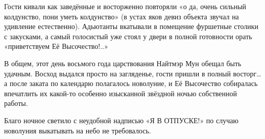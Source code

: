 \documentclass[twoside,a5paper,12pt]{extbook}
\begin{document}
Гости кивали как заведённые и восторженно повторяли «о да, очень сильный колдунство, пони уметь колдунство» (в устах яков девиз объекта звучал на удивление естественно). Адьютанты вкатывали в помещение фуршетные столики с закусками, а самый голосистый уже стоял у двери в полной готовности орать «приветствуем Её Высочество!..»

В общем, этот день восьмого года царствования Найтмэр Мун обещал быть удачным. Восход выдался просто на загляденье, гости пришли в полный восторг… а после заката по календарю полагалось новолуние, и Её Высочество собиралась впечатлить их какой-то особенно изысканной звёздной ночью собственной работы.

Благо ночное светило с неудобной надписью «{\huge Я В ОТПУСКЕ!}» по случаю новолуния выкатывать на небо не требовалось.
\end{document}
